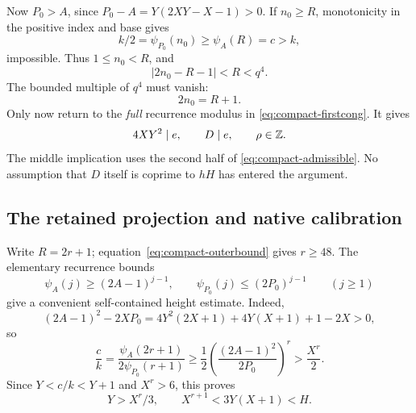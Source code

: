 Now \(P_0>A\), since
\(P_0-A=Y(2XY-X-1)>0\).  If \(n_0\ge R\), monotonicity in the
positive index and base gives
\[
 k/2=\psi_{P_0}(n_0)\ge\psi_A(R)=c>k,
\]
impossible.  Thus \(1\le n_0<R\), and
\[
 |2n_0-R-1|<R<q^4.
\]
The bounded multiple of \(q^4\) must vanish:
\begin{equation}
 2n_0=R+1.                                       \label{eq:compact-firstindex}
\end{equation}
Only now return to the \emph{full} recurrence modulus in
\eqref{eq:compact-firstcong}.  It gives
\[
 4XY^2\mid e,\qquad D\mid e,\qquad \rho\in\mathbb Z.
\]
The middle implication uses the second half of
\eqref{eq:compact-admissible}.  No assumption that \(D\) itself is
coprime to \(hH\) has entered the argument.

\subsection{The retained projection and native calibration}
\label{subsec:compact-transfer}

Write \(R=2r+1\); equation~\eqref{eq:compact-outerbound} gives \(r\ge48\).
The elementary recurrence bounds
\[
 \psi_A(j)\ge(2A-1)^{j-1},\qquad
 \psi_{P_0}(j)\le(2P_0)^{j-1}\qquad(j\ge1)
\]
give a convenient self-contained height estimate.  Indeed,
\[
 (2A-1)^2-2XP_0
 =4Y^2(2X+1)+4Y(X+1)+1-2X>0,
\]
so
\[
 \frac ck=
 \frac{\psi_A(2r+1)}{2\psi_{P_0}(r+1)}
 \ge\frac12\left(\frac{(2A-1)^2}{2P_0}\right)^r
 >\frac{X^r}{2}.
\]
Since \(Y<c/k<Y+1\) and \(X^r>6\), this proves
\begin{equation}
 Y>X^r/3,\qquad X^{r+1}<3Y(X+1)<H.                \label{eq:compact-ratiobound}
\end{equation}

